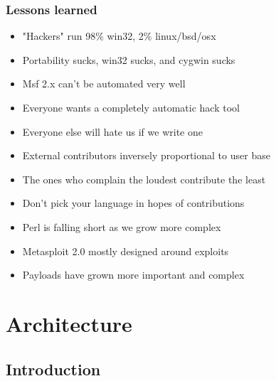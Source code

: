 \documentclass{beamer}
\newenvironment{sitemize}{\vspace{1mm}\begin{itemize}\itemsep 4pt\small}{\end{itemize}}
\begin{document}
\begin{frame}[t]
  \frametitle{Lessons learned}
  
  \begin{sitemize}
    \item "Hackers" run 98\% win32, 2\% linux/bsd/osx
    \item Portability sucks, win32 sucks, and cygwin sucks
  \end{sitemize}
  \pause
  \begin{sitemize}
    \item Msf 2.x can't be automated very well
    \item Everyone wants a completely automatic hack tool
    \pause
    \item Everyone else will hate us if we write one
  \end{sitemize}
  \pause
  \begin{sitemize}
    \item External contributors inversely proportional to user base
    \item The ones who complain the loudest contribute the least
    \pause
    \item Don't pick your language in hopes of contributions
    \item Perl is falling short as we grow more complex
  \end{sitemize}
  \pause
  \begin{sitemize}
    \item Metasploit 2.0 mostly designed around exploits
    \item Payloads have grown more important and complex
  \end{sitemize}
  
\end{frame}

\section{Architecture}
\subsection{Introduction}
\end{document}
